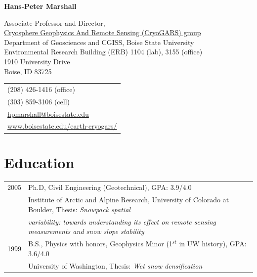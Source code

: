 \documentclass[11pt]{article}
\def\name{Hans-Peter Marshall}
\begin{document}

\centerline{\Large \bf \name}

\vspace{0.15in}

\begin{minipage}{0.70\linewidth}
Associate Professor and Director, \\
  \href{http://earth.boisestate.edu/cryogars/}{Cryosphere Geophysics And Remote Sensing (CryoGARS) group} \\
  Department of Geosciences and CGISS, Boise State University \\
  Environmental Research Building (ERB) 1104 (lab), 3155 (office) \\
  1910 University Drive \\
  Boise, ID  83725
\end{minipage}
\begin{minipage}{0.30\linewidth}
  \begin{tabular}{l}
     (208) 426-1416 (office) \\
     (303) 859-3106 (cell) \\
    \href{mailto:hpmarshall@boisestate.edu}{hpmarshall@boisestate.edu} \\
    \href{https://www.boisestate.edu/earth-cryogars/}{www.boisestate.edu/earth-cryogars/} \\
  \end{tabular}
\end{minipage}

\section*{Education}

\begin{tabular}{ll}
	2005 & Ph.D, Civil Engineering (Geotechnical), GPA: 3.9/4.0 \\
	          & Institute of Arctic and Alpine Research, University of Colorado at Boulder, Thesis: \textit{Snowpack spatial} \\
	          & \textit{variability: towards understanding its effect on remote sensing measurements and snow slope stability} \\
	1999 &  B.S., Physics with honors, Geophysics Minor (1$^{st}$ in UW history), GPA: 3.6/4.0 \\
	         &   University of Washington, Thesis: \textit{Wet snow densification} \\
\end{tabular}
\end{document}
